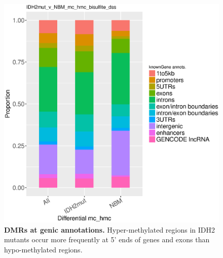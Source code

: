 \begin{figure}[ht!]
\centering
\includegraphics[width=1\textwidth]{chap5figs/figure5_12.eps}
\caption[DMRs at genic annotations.]
{
\textbf{DMRs at genic annotations.} Hyper-methylated regions in IDH2 mutants occur more frequently at 5' ends of genes and exons than hypo-methylated regions.
}
\label{chap5:fig:12}
\end{figure}

\newpage

